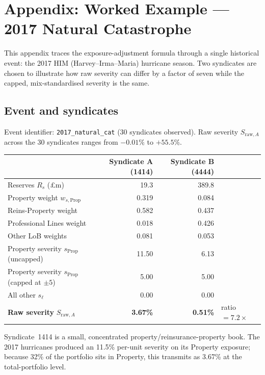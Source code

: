 \section*{Appendix: Worked Example --- 2017 Natural Catastrophe}

This appendix traces the exposure-adjustment formula through a single
historical event: the 2017 HIM (Harvey--Irma--Maria) hurricane season.
Two syndicates are chosen to illustrate how raw severity can differ
by a factor of seven while the capped, mix-standardised severity is the
same.

\subsection*{Event and syndicates}

Event identifier: \texttt{2017\_natural\_cat} (30 syndicates observed).
Raw severity $S_{\text{raw},A}$ across the 30 syndicates ranges from
$-0.01\%$ to $+55.5\%$.

\medskip
\begin{tabular}{lrrl}
\toprule
 & Syndicate A (1414) & Syndicate B (4444) & \\
\midrule
Reserves $R_s$ (\pounds m) & 19.3 & 389.8 & \\
Property weight $w_{s,\text{Prop}}$ & 0.319 & 0.084 & \\
Reins-Property weight & 0.582 & 0.437 & \\
Professional Lines weight & 0.018 & 0.426 & \\
Other LoB weights & 0.081 & 0.053 & \\
\addlinespace
Property severity $s_{\text{Prop}}$ (uncapped) & 11.50 & 6.13 & \\
Property severity $s_{\text{Prop}}$ (capped at $\pm 5$) & 5.00 & 5.00 & \\
All other $s_\ell$ & 0.00 & 0.00 & \\
\addlinespace
\textbf{Raw severity} $S_{\text{raw},A}$ & \textbf{3.67\%} & \textbf{0.51\%} & ratio $= 7.2\times$ \\
\bottomrule
\end{tabular}

\medskip
Syndicate~1414 is a small, concentrated property/reinsurance-property
book.  The 2017 hurricanes produced an 11.5\% per-unit severity on its
Property exposure; because 32\% of the portfolio sits in Property,
this transmits as 3.67\% at the total-portfolio level.

